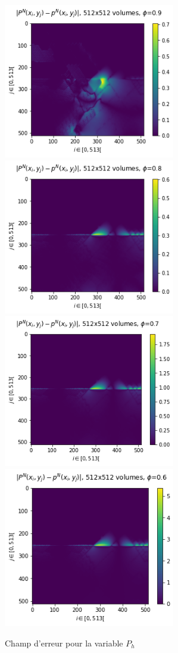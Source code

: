 \begin{figure}[htp]
    \centering
    \includegraphics[width=7.5cm]{Images/bicouche/0.9/Figure 2021-11-18 231238 (59).png}
    \includegraphics[width=7.5cm]{Images/bicouche/0.8/Figure 2021-11-18 231238 (51).png}
    \includegraphics[width=7.5cm]{Images/bicouche/0.7/Figure 2021-11-18 231238 (43).png}
    \includegraphics[width=7.5cm]{Images/bicouche/0.6/Figure 2021-11-18 231238 (35).png}
    \caption{Champ d'erreur pour la variable $P_h$}
\end{figure}

